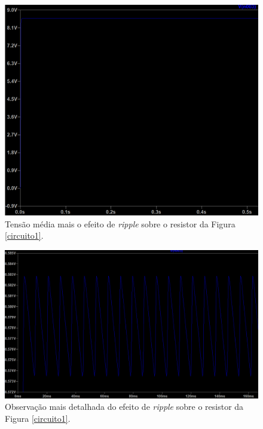 \documentclass[journal, a4paper]{IEEEtran}
\begin{document}
     \begin{figure}[H]
		\begin{center}
		\includegraphics[width=\columnwidth]{circuito1_tensao_resistor_1.PNG}
		\caption{Tensão média mais o efeito de \textit{ripple} sobre o resistor da Figura \ref{circuito1}.}
		\label{V_resistor}
		\end{center}
	\end{figure}
    
     \begin{figure}[H]
		\begin{center}
		\includegraphics[width=\columnwidth]{circuito1_tensao_resistor_2.PNG}
		\caption{Observação mais detalhada do efeito de \textit{ripple} sobre o resistor da Figura \ref{circuito1}.}
		\label{V_resistor_ripple}
		\end{center}
	\end{figure}
    
\end{document}
